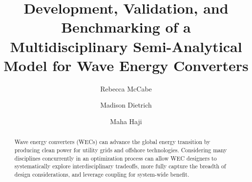 \documentclass[preprint,12pt]{elsarticle}
\begin{document}

\begin{frontmatter}



\title{Development, Validation, and Benchmarking of a Multidisciplinary Semi-Analytical Model for Wave Energy Converters}

\author[MAE]{Rebecca McCabe}
\author[MAE]{Madison Dietrich}
\author[mich]{Maha Haji}




\begin{abstract}
Wave energy converters (WECs) can advance the global energy transition by producing clean power for utility grids and offshore technologies.
Considering many disciplines concurrently in an optimization process can allow WEC designers to systematically explore interdisciplinary tradeoffs, more fully capture the breadth of design considerations, and leverage coupling for system-wide benefit.


\end{abstract}
\end{frontmatter}
\end{document}
